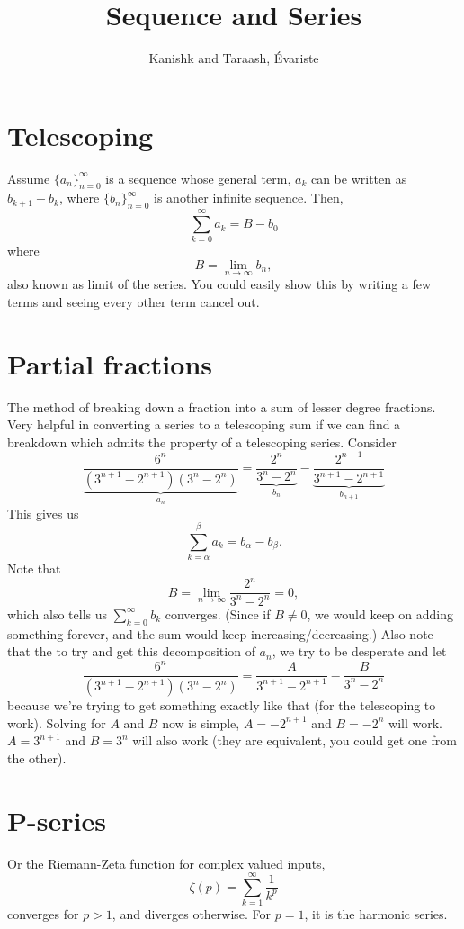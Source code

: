\documentclass[]{article}
\begin{document}
\title{Sequence and Series}
\author{Kanishk and Taraash, \'Evariste}
\date{}

\setcounter{secnumdepth}{0}
\maketitle

\section{Telescoping}
Assume $\{a_n\}_{n=0}^{\infty}$ is a sequence whose general term, $a_k$ can be written as $b_{k+1}-b_{k}$, where $\{b_n\}_{n=0}^{\infty}$ is another infinite sequence. Then, \[\sum_{k=0}^{\infty}a_k=B-b_0\] where \[B=\lim_{n\to\infty}b_n,\] also known as limit of the series. You could easily show this by writing a few terms and seeing every other term cancel out.

\section{Partial fractions}
The method of breaking down a fraction into a sum of lesser degree fractions. Very helpful in converting a series to a telescoping sum if we can find a breakdown which admits the property of a telescoping series. Consider \[\underbrace{\frac{6^n}{(3^{n+1}-2^{n+1})(3^n-2^n)}}_{a_n}=\underbrace{\frac{2^n}{3^n-2^n}}_{b_n}-\underbrace{\frac{2^{n+1}}{3^{n+1}-2^{n+1}}}_{b_{n+1}}\]
This gives us \[\sum_{k=\alpha}^{\beta}a_k=b_\alpha-b_\beta.\]
Note that \[B=\lim_{n\to\infty}\frac{2^n}{3^n-2^n}=0,\]
which also tells us $\sum_{k=0}^{\infty}b_k$ converges. (Since if $B\neq0$, we would keep on adding something forever, and the sum would keep increasing/decreasing.)
Also note that the to try and get this decomposition of $a_n$, we try to be desperate and let \[{\frac{6^n}{(3^{n+1}-2^{n+1})(3^n-2^n)}}=\frac{A}{3^{n+1}-2^{n+1}}-\frac{B}{3^n-2^n}\] because we're trying to get something exactly like that (for the telescoping to work). Solving for $A$ and $B$ now is simple, $A=-2^{n+1}$ and $B=-2^n$ will work. $A=3^{n+1}$ and $B=3^n$ will also work (they are equivalent, you could get one from the other).

\section{P-series}
Or the Riemann-Zeta function for complex valued inputs, \[\zeta(p)=\sum_{k=1}^{\infty}\frac{1}{k^p}\] converges for $p>1$, and diverges otherwise. For $p=1$, it is the harmonic series.
\end{document}
